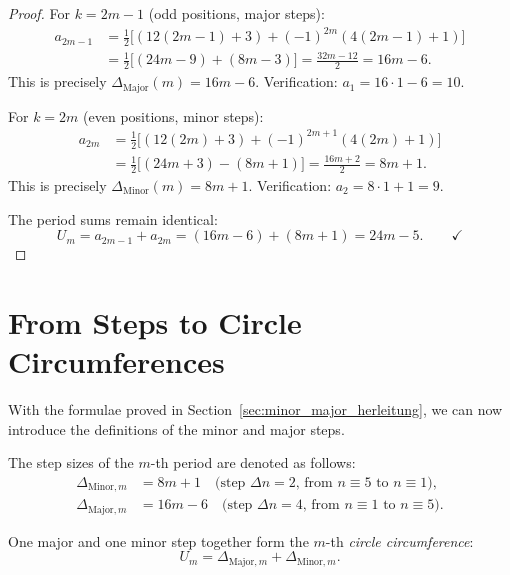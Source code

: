 \begin{proof}
For $k = 2m-1$ (odd positions, major steps):
\begin{align*}
  a_{2m-1}
  &= \frac{1}{2}\bigl[(12(2m-1)+3) + (-1)^{2m}(4(2m-1)+1)\bigr] \\
  &= \frac{1}{2}\bigl[(24m-9) + (8m-3)\bigr]
  = \frac{32m-12}{2} = 16m-6.
\end{align*}
This is precisely $\Delta_{\mathrm{Major}}(m) = 16m-6$. \quad
Verification: $a_1 = 16\cdot1-6 = 10$. \checkmark

For $k = 2m$ (even positions, minor steps):
\begin{align*}
  a_{2m}
  &= \frac{1}{2}\bigl[(12(2m)+3) + (-1)^{2m+1}(4(2m)+1)\bigr] \\
  &= \frac{1}{2}\bigl[(24m+3) - (8m+1)\bigr]
  = \frac{16m+2}{2} = 8m+1.
\end{align*}
This is precisely $\Delta_{\mathrm{Minor}}(m) = 8m+1$. \quad
Verification: $a_2 = 8\cdot1+1 = 9$. \checkmark

The period sums remain identical:
\[
  U_m = a_{2m-1} + a_{2m}
      = (16m-6) + (8m+1)
      = 24m - 5. \qquad\checkmark
\]
\end{proof}

\section{From Steps to Circle Circumferences}

With the formulae proved in Section~\ref{sec:minor_major_herleitung},
we can now introduce the definitions of the minor and major steps.

\begin{definition}
The step sizes of the $m$-th period are denoted as follows:
\begin{align}
  \Delta_{\mathrm{Minor},m} &= 8m + 1 \quad
    \text{(step $\Delta n = 2$, from } n\equiv5 \text{ to } n\equiv1\text{)},\\
  \Delta_{\mathrm{Major},m} &= 16m - 6 \quad
    \text{(step $\Delta n = 4$, from } n\equiv1 \text{ to } n\equiv5\text{)}.
\end{align}
\end{definition}

\begin{definition}
One major and one minor step together form the $m$-th
\emph{circle circumference}:
\begin{equation}
  U_m = \Delta_{\mathrm{Major},m} + \Delta_{\mathrm{Minor},m}.
\end{equation}
\end{definition}

